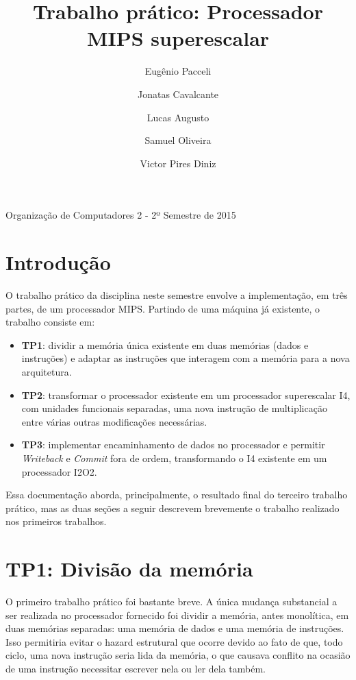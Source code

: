 \documentclass[12pt,a4paper]{article}
\title{Trabalho prático: Processador MIPS superescalar}
\author{
    Eugênio Pacceli
    \and
    Jonatas Cavalcante
    \and
    Lucas Augusto
    \and
    Samuel Oliveira
    \and
    Victor Pires Diniz
}
\numberwithin{equation}{section}
\begin{document}
\maketitle
\begin{center}
Organização de Computadores 2 - 2º Semestre de 2015
\end{center}

\section{Introdução}

O trabalho prático da disciplina neste semestre envolve a implementação, em três partes, de um processador MIPS. Partindo de uma máquina já existente, o trabalho consiste em:

\begin{itemize}
    \item \textbf{TP1}: dividir a memória única existente em duas memórias (dados e instruções) e adaptar as instruções que interagem com a memória para a nova arquitetura.
    \item \textbf{TP2}: transformar o processador existente em um processador superescalar I4, com unidades funcionais separadas, uma nova instrução de multiplicação entre várias outras modificações necessárias.
    \item \textbf{TP3}: implementar encaminhamento de dados no processador e permitir \emph{Writeback} e \emph{Commit} fora de ordem, transformando o I4 existente em um processador I2O2.
\end{itemize}

Essa documentação aborda, principalmente, o resultado final do terceiro trabalho prático, mas as duas seções a seguir descrevem brevemente o trabalho realizado nos primeiros trabalhos.

\section{TP1: Divisão da memória}

O primeiro trabalho prático foi bastante breve. A única mudança substancial a ser realizada no processador fornecido foi dividir a memória, antes monolítica, em duas memórias separadas: uma memória de dados e uma memória de instruções. Isso permitiria evitar o hazard estrutural que ocorre devido ao fato de que, todo ciclo, uma nova instrução seria lida da memória, o que causava conflito na ocasião de uma instrução necessitar escrever nela ou ler dela também.
\end{document}
